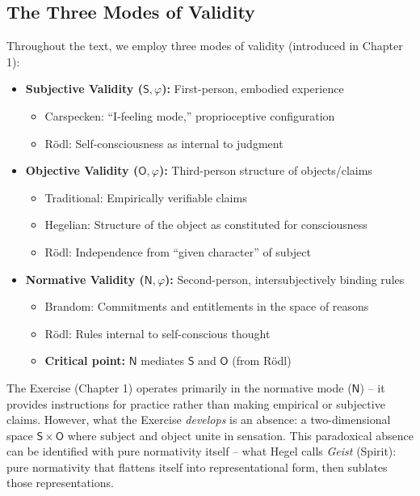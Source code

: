 \documentclass[12pt]{book}
\begin{document}
\subsection{The Three Modes of Validity}

Throughout the text, we employ three modes of validity (introduced in Chapter 1):

\begin{itemize}
    \item \textbf{Subjective Validity ($\mathsf{S},\varphi$):} First-person, embodied experience
    \begin{itemize}
        \item Carspecken: ``I-feeling mode,'' proprioceptive configuration
        \item Rödl: Self-consciousness as internal to judgment
    \end{itemize}
    
    \item \textbf{Objective Validity ($\mathsf{O},\varphi$):} Third-person structure of objects/claims
    \begin{itemize}
        \item Traditional: Empirically verifiable claims
        \item Hegelian: Structure of the object as constituted for consciousness
        \item Rödl: Independence from ``given character'' of subject
    \end{itemize}
    
    \item \textbf{Normative Validity ($\mathsf{N},\varphi$):} Second-person, intersubjectively binding rules
    \begin{itemize}
        \item Brandom: Commitments and entitlements in the space of reasons
        \item Rödl: Rules internal to self-conscious thought
        \item \textbf{Critical point:} $\mathsf{N}$ mediates $\mathsf{S}$ and $\mathsf{O}$ (from Rödl)
    \end{itemize}
\end{itemize}

The Exercise (Chapter 1) operates primarily in the normative mode ($\mathsf{N}$) -- it provides instructions for practice rather than making empirical or subjective claims. However, what the Exercise \textit{develops} is an absence: a two-dimensional space $\mathsf{S} \times \mathsf{O}$ where subject and object unite in sensation. This paradoxical absence can be identified with pure normativity itself -- what Hegel calls \textit{Geist} (Spirit): pure normativity that flattens itself into representational form, then sublates those representations.
\end{document}
